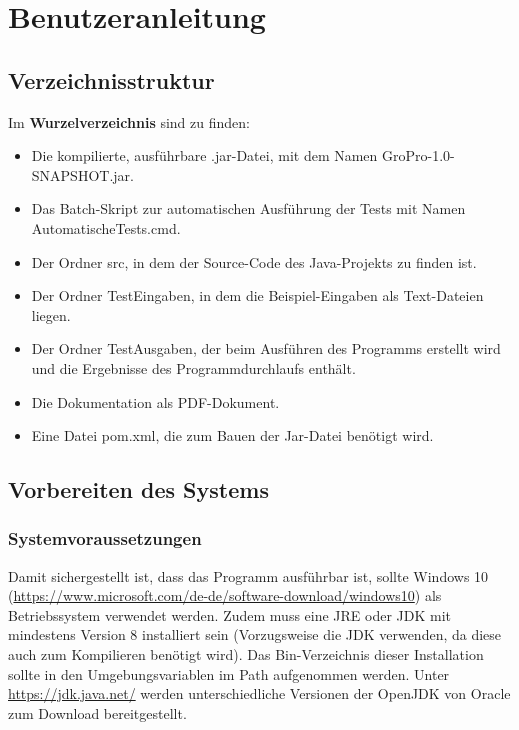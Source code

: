 \chapter{Benutzeranleitung}\label{ch:benutzeranleitung}

\section{Verzeichnisstruktur}\label{sec:verzeichnisstruktur}
Im \textbf{Wurzelverzeichnis} sind zu finden:
\begin{itemize}[noitemsep]
    \item Die kompilierte, ausführbare .jar-Datei, mit dem Namen \glqq GroPro-1.0-\\SNAPSHOT.jar\grqq{}.
    \item Das Batch-Skript zur automatischen Ausführung der Tests mit Namen \glqq AutomatischeTests.cmd\grqq{}.
    \item Der Ordner \glqq src\grqq{}, in dem der Source-Code des Java-Projekts zu finden ist.
    \item Der Ordner \glqq TestEingaben\grqq{}, in dem die Beispiel-Eingaben als Text-Dateien liegen.
    \item Der Ordner \glqq TestAusgaben\grqq{}, der beim Ausführen des Programms erstellt wird und die Ergebnisse des Programmdurchlaufs enthält.
    \item Die Dokumentation als PDF-Dokument.
    \item Eine Datei \glqq pom.xml\grqq{}, die zum Bauen der Jar-Datei benötigt wird.
\end{itemize}


\section{Vorbereiten des Systems}\label{sec:vorbereiten-des-systems}

\subsection{Systemvoraussetzungen}\label{subsec:systemvoraussetzungen}
Damit sichergestellt ist, dass das Programm ausführbar ist, sollte Windows 10 (\url{https://www.microsoft.com/de-de/software-download/windows10}) als Betriebssystem verwendet werden.
Zudem muss eine JRE oder JDK mit mindestens Version 8 installiert sein (Vorzugsweise die JDK verwenden, da diese auch zum Kompilieren benötigt wird).
Das Bin-Verzeichnis dieser Installation sollte in den Umgebungsvariablen im Path aufgenommen werden.
Unter \url{https://jdk.java.net/} werden unterschiedliche Versionen der OpenJDK von Oracle zum Download bereitgestellt.


